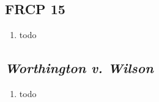 \subsection{FRCP 15}

\begin{enumerate}
    \item todo
\end{enumerate}

\subsection{\emph{Worthington v. Wilson}}

\begin{enumerate}
    \item todo
\end{enumerate}
